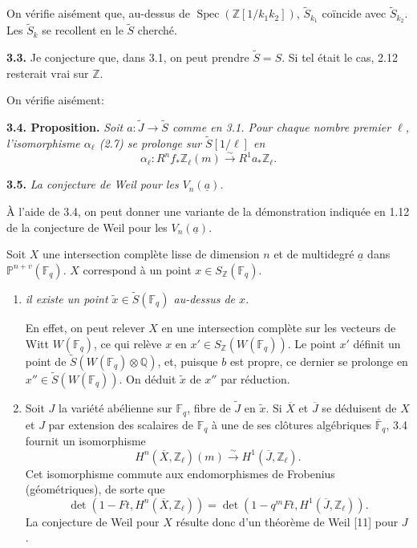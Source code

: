 \documentclass[10pt]{article}
\newcommand{\F}{\mathbb F}
\newcommand{\Pj}{\mathbb P}
\newcommand{\Q}{\mathbb Q}
\newcommand{\Z}{\mathbb Z}
\newcommand{\Spec}{\operatorname{Spec}}
\newcommand{\iso}{\xrightarrow{\sim}}
\newcommand{\sourcebreak}{\clearpage}
\begin{document}
On vérifie aisément que, au-dessus de \(\Spec(\Z[1/k_1k_2])\), \(\widetilde S_{k_1}\) coïncide avec \(\widetilde S_{k_2}\). Les \(\widetilde S_k\) se recollent en le \(\widetilde S\) cherché.

\noindent\textbf{3.3.} Je conjecture que, dans 3.1, on peut prendre \(\widetilde S=S\). Si tel était le cas, 2.12 resterait vrai sur \(\Z\).

\sourcebreak
On vérifie aisément:

\noindent\textbf{3.4. Proposition.} \emph{Soit \(a:\widetilde J\longrightarrow\widetilde S\) comme en 3.1. Pour chaque nombre premier \(\ell\), l'isomorphisme \(\alpha_\ell\) (2.7) se prolonge sur \(\widetilde S[1/\ell]\) en}
\[
\alpha_\ell:R^nf_*\Z_\ell(m)\iso R^1a_*\Z_\ell.
\]

\noindent\textbf{3.5.} \emph{La conjecture de Weil pour les \(V_n(\underline a)\).}

À l'aide de 3.4, on peut donner une variante de la démonstration indiquée en 1.12 de la conjecture de Weil pour les \(V_n(\underline a)\).

Soit \(X\) une intersection complète lisse de dimension \(n\) et de multidegré \(\underline a\) dans \(\Pj^{n+v}(\F_q)\). \(X\) correspond à un point \(x\in S_\Z(\F_q)\).

\begin{enumerate}[label=\alph*)]
\item \emph{il existe un point \(\widetilde x\in\widetilde S(\F_q)\) au-dessus de \(x\).}

En effet, on peut relever \(X\) en une intersection complète sur les vecteurs de Witt \(W(\F_q)\), ce qui relève \(x\) en \(x'\in S_\Z(W(\F_q))\). Le point \(x'\) définit un point de \(\widetilde S(W(\F_q)\otimes\Q)\), et, puisque \(b\) est propre, ce dernier se prolonge en \(x''\in\widetilde S(W(\F_q))\). On déduit \(\widetilde x\) de \(x''\) par réduction.

\item Soit \(J\) la variété abélienne sur \(\F_q\), fibre de \(\widetilde J\) en \(\widetilde x\). Si \(\overline X\) et \(\overline J\) se déduisent de \(X\) et \(J\) par extension des scalaires de \(\F_q\) à une de ses clôtures algébriques \(\overline{\F}_q\), 3.4 fournit un isomorphisme
\[
H^n(\overline X,\Z_\ell)(m)\iso H^1(\overline J,\Z_\ell).
\]
Cet isomorphisme commute aux endomorphismes de Frobenius (géométriques), de sorte que
\[
\tag{3.5.1}
\det(1-Ft,H^n(\overline X,\Z_\ell))
=\det(1-q^mFt,H^1(\overline J,\Z_\ell)).
\]
La conjecture de Weil pour \(X\) résulte donc d'un théorème de Weil [11] pour \(J\).
\end{enumerate}
\end{document}
